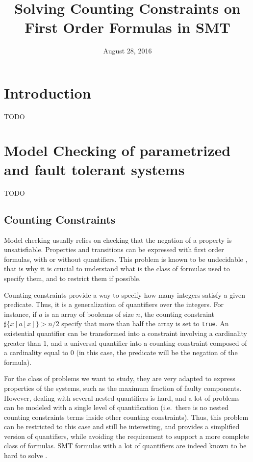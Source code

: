 \documentclass[]{article}
\title{Solving Counting Constraints on First Order Formulas in SMT}
\date{August 28, 2016}
\begin{document}
\maketitle

{
\setcounter{tocdepth}{3}
\tableofcontents
}

\newtheorem{definition}{Definition} \newtheorem{lemma}{Lemma}
\newtheorem{theorem}{Theorem} \newtheorem{property}{Property}

\section*{Introduction}\label{introduction}

TODO

\section{Model Checking of parametrized and fault tolerant systems}

TODO

\subsection{Counting Constraints}

Model checking usually relies on checking that the negation of a
property is unsatisfiable. Properties and transitions can be expressed
with first order formulas, with or without quantifiers. This problem is
known to be undecidable \cite{apt1986limits}, that
is why it is crucial to understand what is the class of formulas used to
specify them, and to restrict them if possible.

Counting constraints provide a way to specify how many integers satisfy
a given predicate. Thus, it is a generalization of quantifiers over the
integers. For instance, if $a$ is an array of booleans of size $n$,
the counting constraint $\sharp\{ x \ |\ a[x]\} > n/2$ specify that
more than half the array is set to \texttt{true}. An existential
quantifier can be transformed into a constraint involving a cardinality
greater than 1, and a universal quantifier into a counting constraint
composed of a cardinality equal to 0 (in this case, the predicate will
be the negation of the formula).

For the class of problems we want to study, they are very adapted to
express properties of the systems, such as the maximum fraction of
faulty components. However, dealing with several nested quantifiers is
hard, and a lot of problems can be modeled with a single level of
quantification (i.e.~there is no nested counting constraints terms
inside other counting constraints). Thus, this problem can be restricted
to this case and still be interesting, and provides a simplified version
of quantifiers, while avoiding the requirement to support a more
complete class of formulas. SMT formulas with a lot of quantifiers are
indeed known to be hard to solve \cite{ge2009complete}.
\end{document}
